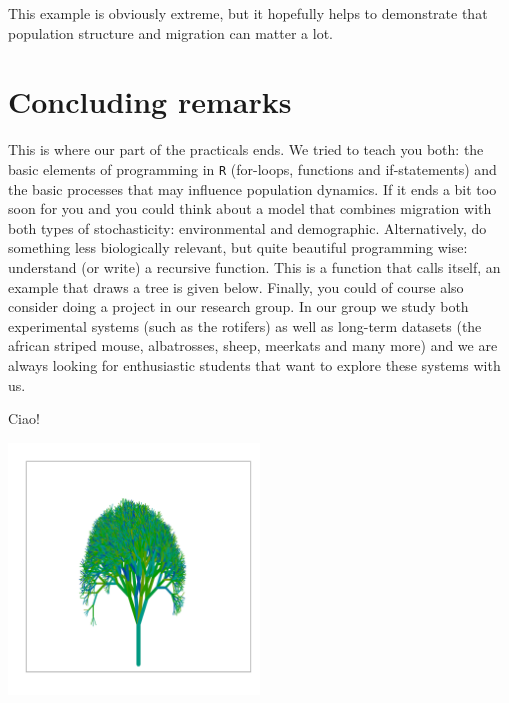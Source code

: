 \documentclass{article}\usepackage[]{graphicx}\usepackage[]{color}
\newenvironment{knitrout}{}{} %
\begin{document}
This example is obviously extreme, but it hopefully helps to demonstrate that population structure and migration can matter a lot. 

\section{Concluding remarks}

This is where our part of the practicals ends. We tried to teach you both: the basic elements of programming in \texttt{R} (for-loops, functions and if-statements) and the basic processes that may influence population dynamics. If it ends a bit too soon for you and you could think about a model that combines migration with both types of stochasticity: environmental and demographic. Alternatively, do something less biologically relevant, but quite beautiful programming wise: understand (or write) a recursive function. This is a function that calls itself, an example that draws a tree is given below. 
Finally, you could of course also consider doing a project in our research group. In our group we study both experimental systems (such as the rotifers) as well as long-term datasets (the african striped mouse, albatrosses, sheep, meerkats and many more) and we are always looking for enthusiastic students that want to explore these systems with us.

\begin{center}
Ciao!
\end{center}
\begin{knitrout}
\color{fgcolor}

{\centering \includegraphics[width=0.5\textwidth]{figure/rectree-1} 

}



\end{knitrout}
\end{document}

